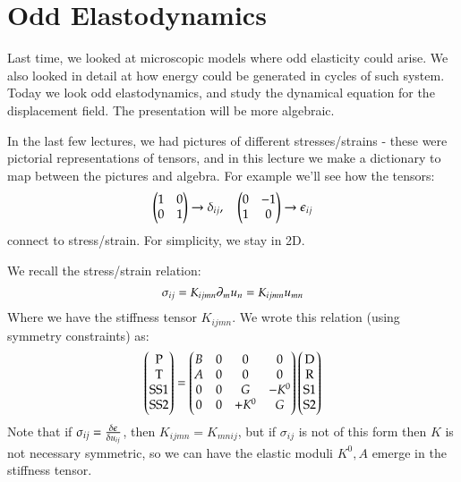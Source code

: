 \section{Odd Elastodynamics}

Last time, we looked at microscopic models where odd elasticity could arise. We also looked in detail at how energy could be generated in cycles of such system. Today we look odd elastodynamics, and study the dynamical equation for the displacement field. The presentation will be more algebraic.

In the last few lectures, we had pictures of different stresses/strains - these were pictorial representations of tensors, and in this lecture we make a dictionary to map between the pictures and algebra. For example we'll see how the tensors:
\begin{equation}
    \begin{pmatrix}1 & 0 \\ 0 & 1\end{pmatrix} \to \delta_{ij}, \quad \begin{pmatrix}0 & -1 \\ 1 & 0\end{pmatrix} \to \epsilon_{ij}
\end{equation}
connect to stress/strain. For simplicity, we stay in 2D.

We recall the stress/strain relation:
\begin{equation}
    \sigma_{ij} = K_{ijmn}\partial_m u_n  = K_{ijmn}u_{mn}
\end{equation}
Where we have the stiffness tensor $K_{ijmn}$. We wrote this relation (using symmetry constraints) as:
\begin{equation}\label{eq:macroscopic}
    \begin{pmatrix}\text{P} \\ \text{T} \\ \text{SS1} \\ \text{SS2}\end{pmatrix} = \begin{pmatrix}B & 0 & 0 & 0 \\ A & 0 & 0 & 0 \\ 0 & 0 & G & -K^0 \\ 0 & 0 & +K^0 & G\end{pmatrix}\begin{pmatrix}\text{D} \\ \text{R} \\ \text{S1} \\ \text{S2}\end{pmatrix}
\end{equation}
Note that if $\sigma_{ij} = \frac{\delta \epsilon}{\delta u_{ij}}$, then $K_{ijmn} = K_{mnij}$, but if $\sigma_{ij}$ is not of this form then $K$ is not necessary symmetric, so we can have the elastic moduli $K^0, A$ emerge in the stiffness tensor.

